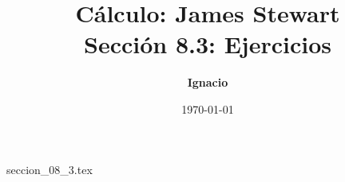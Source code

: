 \documentclass[11pt,spanish,oneside]{report}
\title{\textbf{Cálculo: James Stewart} \\ \Large Sección 8.3: Ejercicios}
\author{\textbf{Ignacio}}
\date{\today}
\begin{document}
\maketitle

{seccion_08_3.tex}
\end{document}
